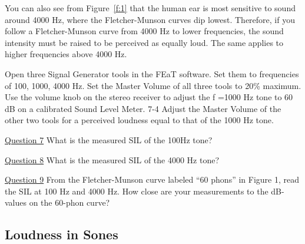 \documentclass[11pt]{NSF}
\begin{document}
You can also see from Figure~\ref{f:1} that the human ear is most sensitive to
sound around 4000 Hz, where the Fletcher-Munson curves dip lowest.
Therefore, if you follow a Fletcher-Munson curve from 4000 Hz to lower
frequencies, the sound intensity must be raised to be perceived as
equally loud. The same applies to higher frequencies above 4000 Hz.

Open three Signal Generator tools in the FEaT software. Set them to frequencies of 100, 1000,
4000 Hz. Set the Master Volume of all three tools to 20\% maximum. Use the volume knob on
the stereo receiver to adjust the f =1000 Hz tone to 60 dB on a calibrated Sound Level Meter.
7-4
Adjust the Master Volume of the other two tools for a perceived loudness equal to that of the
1000 Hz tone. 

\underline{Question 7} What is the measured SIL of the 100Hz tone?

\underline{Question 8} What is the measured SIL of the 4000 Hz tone?

\underline{Question 9} From the Fletcher-Munson curve labeled “60 phons” in Figure 1, read the SIL at 100 Hz and
4000 Hz. How close are your measurements to the dB-values on the 60-phon curve? 

\subsection{Loudness in Sones}
\end{document}
